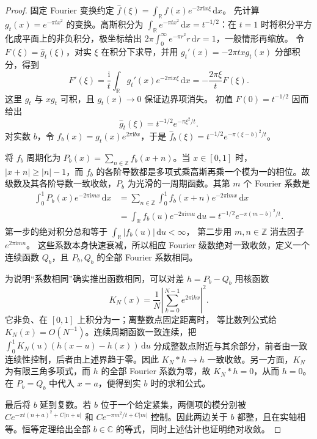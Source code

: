 \begin{proof}
固定 Fourier 变换约定
\(\widehat f(\xi)=\int_{\mathbb R}f(x)e^{-2\pi\mathrm ix\xi}\,\mathrm dx\)。
先计算 \(g_t(x)=e^{-\pi tx^2}\) 的变换。高斯积分为
\(\int_{\mathbb R}e^{-\pi tx^2}\,\mathrm dx=t^{-1/2}\)：在 \(t=1\)
时将积分平方化成平面上的非负积分，极坐标给出
\(2\pi\int_0^\infty e^{-\pi r^2}r\,\mathrm dr=1\)，一般情形再缩放。
令 \(F(\xi)=\widehat g_t(\xi)\)，对实 \(\xi\) 在积分下求导，并用
\(g_t'(x)=-2\pi txg_t(x)\) 分部积分，得到
\[
 F'(\xi)=\frac{\mathrm i}{t}
       \int_{\mathbb R}g_t'(x)e^{-2\pi\mathrm ix\xi}\,\mathrm dx
       =-\frac{2\pi\xi}{t}F(\xi).
\]
这里 \(g_t\) 与 \(xg_t\) 可积，且 \(g_t(x)\to0\) 保证边界项消失。
初值 \(F(0)=t^{-1/2}\) 因而给出
\[
 \widehat g_t(\xi)=t^{-1/2}e^{-\pi\xi^2/t}.
\]
对实数 \(b\)，令 \(f_b(x)=g_t(x)e^{2\pi\mathrm ibx}\)，于是
\(\widehat f_b(\xi)=t^{-1/2}e^{-\pi(\xi-b)^2/t}\)。

将 \(f_b\) 周期化为
\(P_b(x)=\sum_{n\in\mathbb Z}f_b(x+n)\)。当 \(x\in[0,1]\) 时，
\(|x+n|\ge |n|-1\)，而 \(f_b\) 的各阶导数都是多项式乘高斯再乘一个模为一的相位。故级数及其各阶导数一致收敛，\(P_b\) 为光滑的一周期函数。其第 \(m\) 个 Fourier 系数是
\[
\begin{aligned}
 \int_0^1P_b(x)e^{-2\pi\mathrm imx}\,\mathrm dx
 &=\sum_{n\in\mathbb Z}\int_0^1f_b(x+n)e^{-2\pi\mathrm imx}\,\mathrm dx\\
 &=\int_{\mathbb R}f_b(u)e^{-2\pi\mathrm imu}\,\mathrm du
   =t^{-1/2}e^{-\pi(m-b)^2/t}.
\end{aligned}
\]
第一步的绝对积分总和等于 \(\int_{\mathbb R}|f_b(u)|\,\mathrm du<\infty\)，
第二步用 \(m,n\in\mathbb Z\) 消去因子 \(e^{2\pi\mathrm imn}\)。
这些系数本身快速衰减，所以相应 Fourier 级数绝对一致收敛，定义一个连续函数 \(Q_b\)，且 \(P_b,Q_b\) 的全部 Fourier 系数相同。

为说明“系数相同”确实推出函数相同，可以对差 \(h=P_b-Q_b\) 用核函数
\[
 K_N(x)=\frac1N\left|\sum_{k=0}^{N-1}e^{2\pi\mathrm ikx}\right|^2.
\]
它非负、在 \([0,1]\) 上积分为一；离整数点固定距离时，
等比数列公式给 \(K_N(x)=O(N^{-1})\)。连续周期函数一致连续，把
\(\int_0^1K_N(u)(h(x-u)-h(x))\,\mathrm du\) 分成整数点附近与其余部分，前者由一致连续性控制，后者由上述界趋于零。因此
\(K_N*h\to h\) 一致收敛。另一方面，\(K_N\) 为有限三角多项式，而
\(h\) 的全部 Fourier 系数为零，故 \(K_N*h=0\)，从而 \(h=0\)。
在 \(P_b=Q_b\) 中代入 \(x=a\)，便得到实 \(b\) 时的求和公式。

最后将 \(b\) 延到复数。若 \(b\) 位于一个给定紧集，两侧项的模分别被
\(C e^{-\pi t(n+a)^2+C|n+a|}\) 和
\(C e^{-\pi m^2/t+C|m|}\) 控制。因此两边关于 \(b\) 都整，且在实轴相等。恒等定理给出全部 \(b\in\mathbb C\) 的等式，同时上述估计也证明绝对收敛。
\end{proof}

